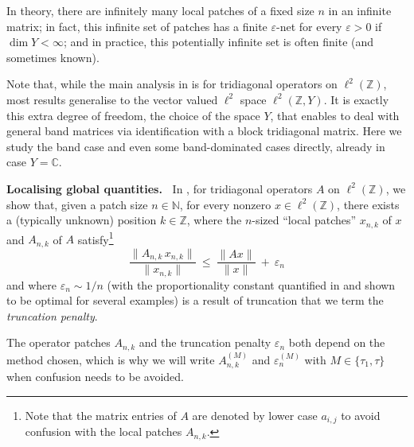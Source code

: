 \documentclass{article}
\newcommand\Marko[1]{\marginpar{\textcolor{blue}{\tt #1}}}
\newcommand\C{{\mathbb C}}
\newcommand\N{{\mathbb N}}
\newcommand\Z{{\mathbb Z}}
\newcommand\eps{{\varepsilon}}
\numberwithin{equation}{section}   %
\numberwithin{figure}{section}  %
\begin{document}

In theory, there are infinitely many local patches of a fixed size $n$ in an infinite matrix; in fact, this infinite set of patches has a finite $\eps$-net for every $\eps>0$ if $\dim Y<\infty$; and in practice, this potentially infinite set is often finite (and sometimes known).

Note that, while the main analysis in \cite{CW.Heng.ML:JST} is for tridiagonal operators on $\ell^2(\Z)$, most results generalise to the vector valued $\ell^2$ space $\ell^2(\Z,Y)$. It is exactly this extra degree of freedom, the choice of the space $Y$, that enables \cite{CW.Heng.ML:JST} to deal with general band matrices via identification with a block tridiagonal matrix. Here we study the band case and even some band-dominated cases directly, already in case $Y=\C$.




\medskip\noindent
{\bf Localising global quantities.\ }
In \cite{CW.Heng.ML:JST}, for tridiagonal operators $A$ on $\ell^2(\Z)$, we show that, given a patch size $n\in\N$, for every nonzero $x\in\ell^2(\Z)$, there exists a (typically unknown) position $k\in\Z$, where the $n$-sized ``local patches'' $ x_{n,k}$ of $x$ and $A_{n,k}$ of $A$ satisfy\footnote{Note that the matrix entries of $A$ are denoted by lower case $a_{i,j}$ to avoid confusion with the local patches $A_{n,k}$.}
\begin{equation} \label{eq:patchAx_intro}
\frac{\|A_{n,k}\, x_{n,k}\|}{\| x_{n,k}\|}\ \le\ \frac{\|Ax\|}{\|x\|}\ +\ \eps_n
\end{equation}
and where $\eps_n\sim 1/n$ (with the proportionality constant quantified in \cite{CW.Heng.ML:JST} and shown to be optimal for several examples) is a result of truncation that we term the {\sl truncation penalty}.

The operator patches $A_{n,k}$ and the truncation penalty $\eps_n$ both depend on the method chosen, which is why we will write $A_{n,k}^{(M)}$ and $\eps_n^{(M)}$ with $M\in\{\tau_1,\tau\}$ when confusion needs to be avoided.
\end{document}
